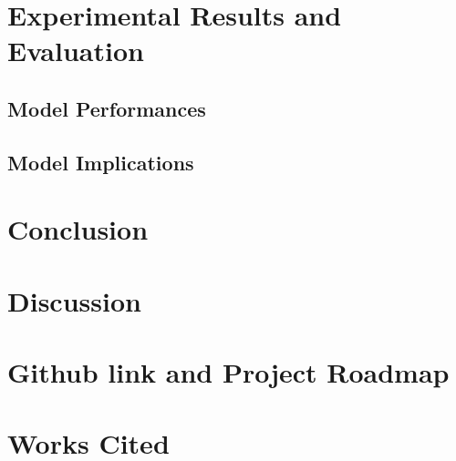 \documentclass[times, twocolumn]{article}
\begin{document}
\section{Experimental Results and Evaluation}
\subsection{Model Performances}

\subsection{Model Implications}

\section{Conclusion}

\section{Discussion}

\section{Github link and Project Roadmap}

\section{Works Cited}
\printbibliography
\end{document}
